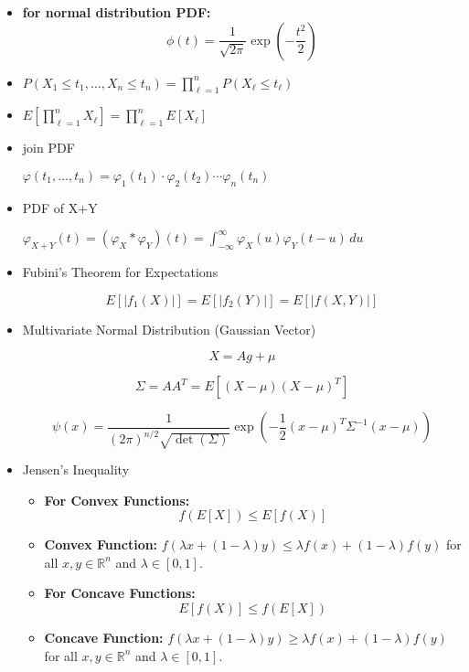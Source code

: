 \documentclass{article}
\begin{document}
\begin{itemize}
  \item \textbf{for normal distribution PDF:}
    \[
    \phi(t) = \frac{1}{\sqrt{2\pi}} \exp\left(-\frac{t^2}{2}\right)
    \]

\item 
    $
    P(X_1 \leq t_1, \ldots, X_n \leq t_n) = \prod_{\ell=1}^{n} P(X_\ell \leq t_\ell)
    $

\item 

    $
    E\left[ \prod_{\ell=1}^{n} X_\ell \right] = \prod_{\ell=1}^{n} E[X_\ell]
    $

\item join PDF

$
    \varphi(t_1, \ldots, t_n) = \varphi_1(t_1) \cdot \varphi_2(t_2) \cdots \varphi_n(t_n)
  $

\item PDF of X+Y

$
    \varphi_{X+Y}(t) = (\varphi_X * \varphi_Y)(t) = \int_{-\infty}^{\infty} \varphi_X(u) \varphi_Y(t - u) \, du
$

\item Fubini's Theorem for Expectations

    \[
    E[|f_1(X)|] = E[|f_2(Y)|] = E[|f(X,Y)|]
    \]

\item Multivariate Normal Distribution (Gaussian Vector)

    \[
    X = A g + \mu
    \]

    \[
    \Sigma = A A^T = E[(X - \mu)(X - \mu)^T]
    \]

        \[
    \psi(x) = \frac{1}{(2\pi)^{n/2} \sqrt{\det(\Sigma)}} \exp\left(-\frac{1}{2} (x - \mu)^T \Sigma^{-1} (x - \mu)\right)
    \]


\item Jensen's Inequality

\begin{itemize}
    \item \textbf{For Convex Functions:} 
    \[
    f(E[X]) \leq E[f(X)]
    \]
    \item \textbf{Convex Function:} \( f(\lambda x + (1 - \lambda)y) \leq \lambda f(x) + (1 - \lambda)f(y) \) for all \( x, y \in \mathbb{R}^n \) and \( \lambda \in [0, 1]. \)

    \item \textbf{For Concave Functions:} 
    \[
    E[f(X)] \leq f(E[X])
    \]
    \item \textbf{Concave Function:} \( f(\lambda x + (1 - \lambda)y) \geq \lambda f(x) + (1 - \lambda)f(y) \) for all \( x, y \in \mathbb{R}^n \) and \( \lambda \in [0, 1]. \)
\end{itemize}



\end{itemize}
\end{document}
